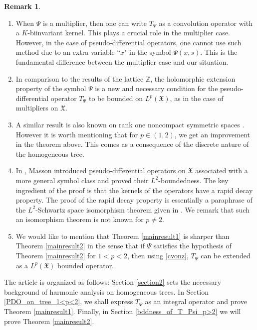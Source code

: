 \documentclass[12pt,reqno]{amsart}
\newcommand{\Z}{\mathbb Z}%
\theoremstyle{definition}
\theoremstyle{definition}
\newtheorem{remark}[theorem]{Remark}
\numberwithin{equation}{section}
\begin{document}
\begin{remark}
\begin{enumerate}
\item When $ \Psi$ is a multiplier, then one can write $ T_\Psi $ as a convolution operator with a $ K $-biinvariant kernel. This plays a crucial role in the multiplier case. However, in the case of pseudo-differential operators, one	cannot use such method due to an extra variable ``$x$" in the symbol $ \Psi(x,s) $. This is the fundamental difference between the multiplier case and our situation. 
\item In comparison to the results of the lattice $ \Z $, the holomorphic extension property of the symbol $\Psi$ is a new and necessary condition  for the pseudo-differential operator $T_{\Psi}$ to be bounded on $L^p(\mathfrak{X})$, as in the case of multipliers on $\mathfrak{X}$.
\item  A similar result is also known on rank one noncompact symmetric spaces \cite [Theorem 1.6]{PR_PDO_22}. However it is worth mentioning that for $ p\in (1,2) $, we get an improvement in the theorem above. This comes as a consequence of the discrete nature  of the homogeneous tree. 
\item In \cite{Masson_14}, Masson introduced pseudo-differential operators on $\mathfrak{X}$ associated with a more general symbol class and proved their $L^{2}$-boundedness. The key ingredient of the proof is that the kernels of the operators have a rapid decay property. The proof of the rapid decay property is  essentially a paraphrase of the $L^{2}$-Schwartz space isomorphism theorem given in \cite[Theorem 2]{MR1680799}. We remark that such an isomorphism theorem is not known for $p\neq 2$.
\item  We would like to mention that Theorem \ref{mainresult1} is sharper than Theorem \ref{mainresult2} in the sense that if $ \Psi $ satisfies the hypothesis of Theorem \ref{mainresult2} for $ 1<p<2 $, then using \eqref{cvonz}, $ T_\Psi $ can be extended as a $ L^p(\mathfrak{X})$ bounded operator.
\end{enumerate}
\end{remark}	

The article is organized as follows: Section \ref{section2} sets the necessary background of harmonic analysis on homogeneous trees. In Section  \ref{PDO_on_tree_1<p<2}, we shall express $T_{\Psi}$ as an integral operator and prove Theorem \ref{mainresult1}. Finally, in Section \ref{bddness_of_T_Psi_p>2} we will prove Theorem \ref{mainresult2}.
\end{document}
